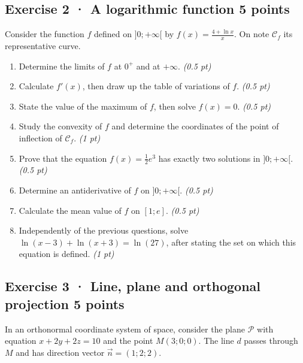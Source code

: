 \subsection*{Exercise 2 · A logarithmic function \hfill 5 points}Consider the function $f$ defined on $]0;+\infty[$ by $f(x)=\frac{4+\ln x}x$. On note $\mathcal C_f$ its representative curve.

\begin{enumerate}

\item Determine the limits of $f$ at $0^+$ and at $+\infty$. \hfill\textit{(0.5 pt)}

\item Calculate $f' (x)$, then draw up the table of variations of $f$. \hfill\textit{(0.5 pt)}

\item State the value of the maximum of $f$, then solve $f(x)=0$. \hfill\textit{(0.5 pt)}

\item Study the convexity of $f$ and determine the coordinates of the point of inflection of $\mathcal C_f$. \hfill\textit{(1 pt)}

\item Prove that the equation $f(x)=\frac12 e^{3}$ has exactly two solutions in $]0;+\infty[$. \hfill\textit{(0.5 pt)}

\item Determine an antiderivative of $f$ on $]0;+\infty[$. \hfill\textit{(0.5 pt)}

\item Calculate the mean value of $f$ on $[1;e]$. \hfill\textit{(0.5 pt)}

\item Independently of the previous questions, solve $\ln(x-3)+\ln(x+3)=\ln(27)$, after stating the set on which this equation is defined. \hfill\textit{(1 pt)}

\end{enumerate}

\clearpage{}\par

\subsection*{Exercise 3 · Line, plane and orthogonal projection \hfill 5 points}In an orthonormal coordinate system of space, consider the plane $\mathcal P$ with equation $x+2y+2z=10$ and the point $M(3;0;0)$. The line $d$ passes through $M$ and has direction vector $\vec n=(1;2;2)$.

